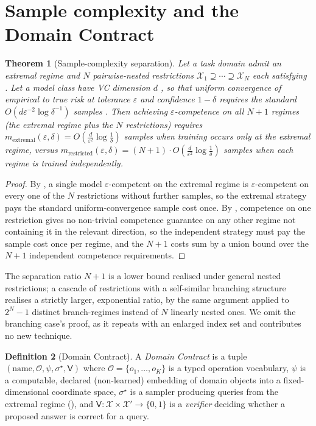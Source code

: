 \documentclass[11pt,twocolumn,a4paper]{article}
\theoremstyle{rdm}
\newtheorem{theorem}{Theorem}[section]
\theoremstyle{definition}
\newtheorem{definition}[theorem]{Definition}
\theoremstyle{remark}
\newcommand{\Cands}{\mathcal{X}}
\newcommand{\Verd}{\mathsf{V}}
\newcommand{\eps}{\varepsilon}
\begin{document}
\section{Sample complexity and the Domain Contract}
\label{sec:domain-contract}

\begin{theorem}[Sample-complexity separation]
\label{thm:sample-sep}
Let a task domain admit an extremal regime and $N$ pairwise-nested
restrictions $\Cands_1 \supseteq \cdots \supseteq \Cands_N$ each satisfying
. Let a model class have VC dimension $d$
\citep{blumer1989}, so that uniform convergence of empirical to true risk at
tolerance $\eps$ and confidence $1-\delta$ requires the standard
$O(d\eps^{-2}\log\delta^{-1})$ samples
\citep{vapnik1998,valiant1984,shalevshwartz2014}. Then achieving
$\eps$-competence on all $N+1$ regimes (the extremal regime plus the $N$
restrictions) requires
$m_{\text{extremal}}(\eps,\delta) = O\!\left(\frac{d}{\eps^2}\log\frac{1}{\delta}\right)$
samples when training occurs only at the extremal regime, versus
$m_{\text{restricted}}(\eps,\delta) = (N+1)\cdot
O\!\left(\frac{d}{\eps^2}\log\frac{1}{\delta}\right)$ samples when each
regime is trained independently.
\end{theorem}

\begin{proof}
By , a single model $\eps$-competent on the extremal
regime is $\eps$-competent on every one of the $N$ restrictions without
further samples, so the extremal strategy pays the standard
uniform-convergence sample cost once. By , competence
on one restriction gives no non-trivial competence guarantee on any other
regime not containing it in the relevant direction, so the independent
strategy must pay the sample cost once per regime, and the $N+1$ costs sum
by a union bound over the $N+1$ independent competence requirements.
\end{proof}

The separation ratio $N+1$ is a lower bound realised under general nested
restrictions; a cascade of restrictions with a self-similar branching
structure realises a strictly larger, exponential ratio, by the same
argument applied to $2^N-1$ distinct branch-regimes instead of $N$ linearly
nested ones. We omit the branching case's proof, as it repeats
 with an enlarged index set and contributes no new
technique.

\begin{definition}[Domain Contract]
\label{def:contract}
A \emph{Domain Contract} is a tuple
$(\text{name}, \mathcal{O}, \psi, \sigma^\star, \Verd)$ where
$\mathcal{O}=\{o_1,\dots,o_K\}$ is a typed operation vocabulary,
$\psi$ is a computable, declared (non-learned) embedding of domain objects
into a fixed-dimensional coordinate space, $\sigma^\star$ is a sampler
producing queries from the extremal regime (), and
$\Verd: \Cands \times \Cands' \to \{0,1\}$ is a \emph{verifier} deciding
whether a proposed answer is correct for a query.
\end{definition}
\end{document}
